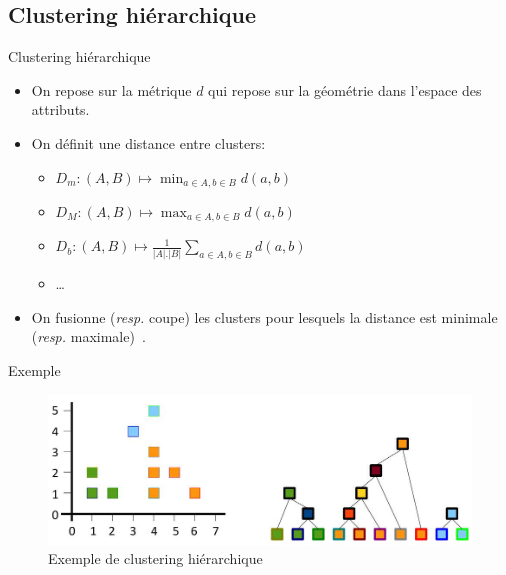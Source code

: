 \documentclass[8pt]{beamer}
\begin{document}
		\subsection{Clustering hiérarchique}
			\begin{frame}{Clustering hiérarchique}
				\begin{itemize}
					\item<1-> On repose sur la métrique \(d\) qui repose sur la géométrie dans l'espace des attributs.
					\item<2-> On définit une distance entre clusters:
						\begin{itemize}
							\item<3-> \(D_m: (A, B) \mapsto \min_{a\in A, b\in B} d(a,b)\)
							\item<4-> \(D_M: (A, B) \mapsto \max_{a\in A, b\in B} d(a,b)\)
							\item<5-> \(D_b: (A, B) \mapsto \frac{1}{\vert A \vert.\vert B \vert}\sum_{a\in A, b\in B} d(a,b)\)
							\item<6-> \dots
						\end{itemize}
					\item<7-> On fusionne (\textit{resp.} coupe) les clusters pour lesquels la distance est minimale (\textit{resp.} maximale)~\cite{hastie2009unsupervised,ward1963hierarchical}.
				\end{itemize}
			\end{frame}
			\begin{frame}{Exemple}
				\begin{figure}[H]
					\includegraphics[width=.8\textwidth]{images/samples/hierchical_clustering.png}
					\caption*{Exemple de clustering hiérarchique}
				\end{figure}
			\end{frame}
\end{document}
